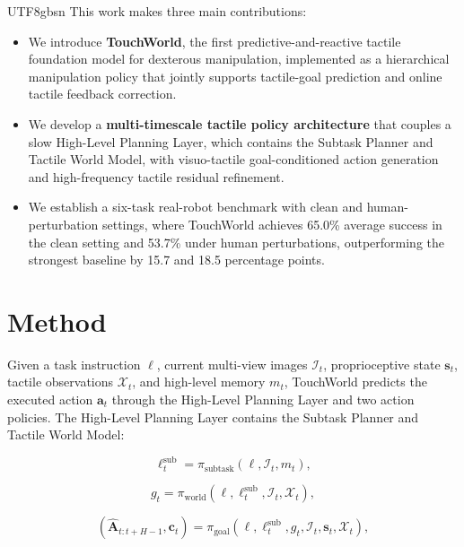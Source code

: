 \documentclass[]{mpai_report}
\begin{document}
\begin{CJK*}{UTF8}{gbsn}
This work makes three main contributions:

\begin{itemize}
    \item We introduce \textbf{TouchWorld}, the first predictive-and-reactive tactile foundation model for dexterous manipulation, implemented as a hierarchical manipulation policy that jointly supports tactile-goal prediction and online tactile feedback correction.
    
    \item We develop a \textbf{multi-timescale tactile policy architecture} that couples a slow High-Level Planning Layer, which contains the Subtask Planner and Tactile World Model, with visuo-tactile goal-conditioned action generation and high-frequency tactile residual refinement.
    
    \item We establish a six-task real-robot benchmark with clean and human-perturbation settings, where TouchWorld achieves 65.0\% average success in the clean setting and 53.7\% under human perturbations, outperforming the strongest baseline by 15.7 and 18.5 percentage points.
\end{itemize}



\section{Method}
\label{sec:method}

Given a task instruction $\ell$, current multi-view images $\mathcal{I}_t$, proprioceptive state $\mathbf{s}_t$, tactile observations $\mathcal{X}_t$, and high-level memory $m_t$, TouchWorld predicts the executed action $\mathbf{a}_t$ through the High-Level Planning Layer and two action policies.
The High-Level Planning Layer contains the Subtask Planner and Tactile World Model:

\begin{equation}
    \ell_t^{\mathrm{sub}} = \pi_{\mathrm{subtask}}(\ell, \mathcal{I}_t, m_t),
\end{equation}

\begin{equation}
    g_t = \pi_{\mathrm{world}}(\ell, \ell_t^{\mathrm{sub}}, \mathcal{I}_t, \mathcal{X}_t),
\end{equation}

\begin{equation}
    \left(\hat{\mathbf{A}}_{t:t+H-1}, \mathbf{c}_t\right) =
    \pi_{\mathrm{goal}}(\ell, \ell_t^{\mathrm{sub}}, g_t, \mathcal{I}_t, \mathbf{s}_t, \mathcal{X}_t),
\end{equation}


\end{CJK*}
\end{document}
